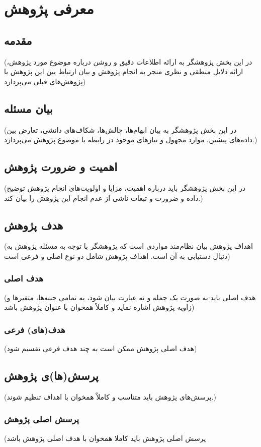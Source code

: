 \chapter{معرفی پژوهش}

\section{مقدمه}
(در این بخش پژوهشگر به ارائه اطلاعات دقیق و روشن درباره موضوع مورد پژوهش، ارائه دلایل منطقی و نظری منجر به انجام پژوهش و بیان ارتباط بین این پژوهش با پژوهش‌های قبلی می‌پردازد) 
\section{بیان مسئله}
(در این بخش پژوهشگر به بیان ابهام‌ها، چالش‌ها، شکاف‌های دانشی، تعارض بین داده‌های پیشین، موارد مجهول و نیازهای موجود در رابطه با موضوع پژوهش می‌پردازد.)
\section{اهمیت و ضرورت پژوهش}
(در این بخش پژوهشگر باید درباره اهمیت، مزایا و اولویت‌های انجام پژوهش توضیح داده و ضرورت و تبعات ناشی از عدم انجام این پژوهش را بیان کند.)
\section{هدف پژوهش}
(اهداف پژوهش بیان نظام‌مند مواردی است که پژوهشگر با توجه به مسئله پژوهش به دنبال دستیابی به آن است. اهداف پژوهش شامل دو نوع اصلی و فرعی است)
\subsection{هدف اصلی}
(هدف اصلی باید به صورت یک جمله و نه عبارت بیان شود، به تمامی جنبه‌ها، متغیرها و زاویه پژوهش اشاره نماید و کاملاً همخوان با عنوان پژوهش باشد)
\subsection{هدف(های) فرعی}
(هدف اصلی پژوهش ممکن است به چند هدف فرعی تقسیم شود)
 \section{پرسش(‌ها)‌ی پژوهش}
(پرسش‌های پژوهش باید متناسب و کاملاٌ همخوان با اهداف تنظیم شوند.)
\subsection{پرسش اصلی پژوهش}
(پرسش اصلی پژوهش باید کاملا همخوان با هدف اصلی پژوهش باشد
